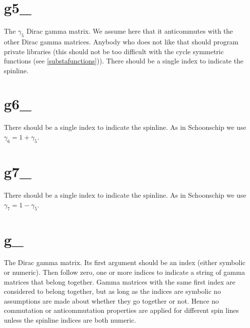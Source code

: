 
\section{g5\_}
\label{fungfive}
\noindent The $\gamma_5$ Dirac gamma matrix. We assume here that it 
anticommutes with the other Dirac gamma 
matrices. Anybody who does not like that should program private libraries 
(this should not be too difficult with the cycle symmetric functions 
(see \ref{substafunctions})). There should be a single index to indicate 
the spinline.


\section{g6\_}
\label{fungsix}
\noindent There should be a single index to indicate the spinline. 
As in Schoonschip we use $\gamma_6 = 1+\gamma_5$.


\section{g7\_}
\label{fungseven}
\noindent There should be a single index to indicate the spinline. 
As in Schoonschip we use $\gamma_7 = 1-\gamma_5$.


\section{g\_}
\label{fung}
\noindent The Dirac gamma matrix. Its 
first argument should be an index (either symbolic or numeric). Then follow 
zero, one or more indices to indicate a string of gamma matrices that 
belong together. Gamma matrices with the same first index are considered to 
belong together, but as long as the indices are symbolic no assumptions are 
made about whether they go together or not. Hence no commutation or 
anticommutation properties are applied for different spin lines unless the 
spinline indices are both numeric.


